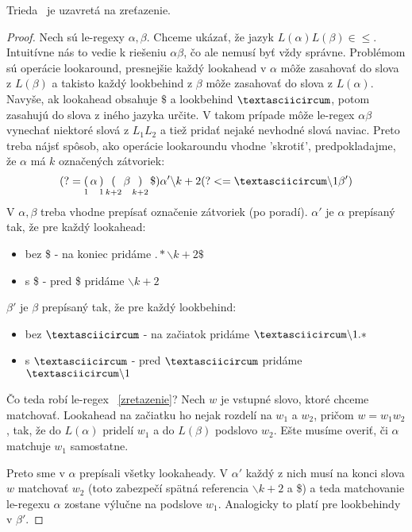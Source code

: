 \begin{veta}
Trieda \le~je uzavretá na zreťazenie.
\end{veta}
\begin{proof}
Nech sú le-regexy $\alpha, \beta$. Chceme ukázať, že jazyk $L(\alpha)L(\beta) \in \le$. Intuitívne nás to vedie k riešeniu $\alpha\beta$, čo ale nemusí byť vždy správne. Problémom sú operácie lookaround, presnejšie každý lookahead v $\alpha$ môže zasahovať do slova z $L(\beta)$ a takisto každý lookbehind z $\beta$ môže zasahovať do slova z $L(\alpha)$. Navyše, ak lookahead obsahuje $\$$ a lookbehind $\textasciicircum$, potom zasahujú do slova z iného jazyka určite. V takom prípade môže le-regex $\alpha\beta$ vynechať niektoré slová z $L_1L_2$ a tiež pridať nejaké nevhodné slová naviac. Preto treba nájsť spôsob, ako operácie lookaroundu vhodne 'skrotiť', predpokladajme, že $\alpha$ má $k$ označených zátvoriek:
\begin{equation} \label{zretazenie}
(?=\mathop(_1 \alpha \mathop)_1 \mathop(_{k+2}\beta \mathop)_{k+2} \mathdollar) \alpha ' \backslash k+2 (?<= \textasciicircum\backslash 1\beta ')
\end{equation}
V $\alpha,\beta$ treba vhodne prepísať označenie zátvoriek (po poradí). $\alpha '$ je $\alpha$ prepísaný tak, že pre každý lookahead:
\begin{itemize}
\item bez \$ - na koniec pridáme $.* \backslash k+2 \mathdollar $
\item s \$ - pred \$ pridáme $\backslash k+2$
\end{itemize}
$\beta '$ je $\beta$ prepísaný tak, že pre každý lookbehind:
\begin{itemize}
\item bez $\textasciicircum$ - na začiatok pridáme $\textasciicircum \backslash 1.*$
\item s $\textasciicircum$ - pred $\textasciicircum$ pridáme $\textasciicircum \backslash 1$
\end{itemize}
Čo teda robí le-regex ~\ref{zretazenie}? Nech $w$ je vstupné slovo, ktoré chceme matchovať. Lookahead na začiatku ho nejak rozdelí na $w_1$ a $w_2$, pričom $w=w_1w_2$, tak, že do $L(\alpha)$ pridelí $w_1$ a do $L(\beta)$ podslovo $w_2$. Ešte musíme overiť, či $\alpha$ matchuje $w_1$ samostatne.

Preto sme v $\alpha$ prepísali všetky lookaheady. V $\alpha '$ každý z nich musí na konci slova $w$ matchovať $w_2$ (toto zabezpečí spätná referencia $\backslash k+2$ a \$) a teda matchovanie le-regexu $\alpha$ zostane výlučne na podslove $w_1$. Analogicky to platí pre lookbehindy v $\beta '$.
\end{proof}

